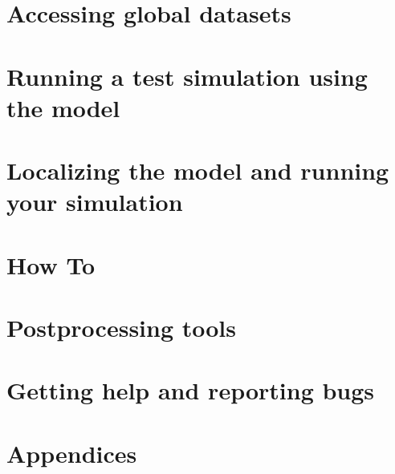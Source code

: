 \documentclass[10pt,twoside,a4paper]{report}
\begin{document}
\chapter{Accessing global datasets}
\label{obdata}

\newpage

\chapter{Running a test simulation using the model}
\label{tutorial}

\newpage

\chapter{Localizing the model and running your simulation}
\label{advanced}

\newpage

\chapter{How To}
\label{howto}

\newpage

\chapter{Postprocessing tools}
\label{postproc}

\newpage

\chapter{Getting help and reporting bugs}
\label{tracker}

\newpage

\cleardoublepage

\chapter{Appendices}
\label{Appendice}


\newpage




\cleardoublepage

\evensidemargin=1.0cm
\oddsidemargin=1.5cm
\end{document}
